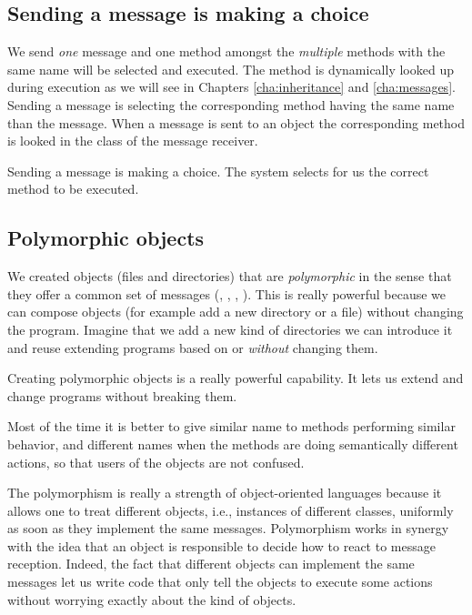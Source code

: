 \documentclass[10pt,twoside,english]{_support/latex/sbabook/sbabook}
\begin{document}
\subsection{Sending a message is making a choice}
We send \textit{one} message and one method amongst the \textit{multiple} methods with the same name will be selected and executed. The method is dynamically looked up during execution as we will see in Chapters \ref{cha:inheritance} and \ref{cha:messages}. Sending a message is selecting the corresponding method having the same name than the message.  When a message is sent to an object the corresponding method is looked in the class of the message receiver.

\begin{important}
Sending a message is making a choice. The system selects for us the correct method to be executed.
\end{important}
\subsection{Polymorphic objects }
We created objects (files and directories) that are \textit{polymorphic} in the sense that they offer a common set of messages (, , , ). This is really powerful because we can compose objects (for example add a new directory or a file) without changing the program. 
Imagine that we add a new kind of directories we can introduce it and reuse extending programs based on  or  \textit{without} changing them. 

\begin{important}
Creating polymorphic objects is a really powerful capability. It lets us extend and change programs without breaking them. 
\end{important}

Most of the time it is better to give similar name to methods performing similar behavior, and different names when the methods are doing semantically different actions, so that users of the objects are not confused. 

The  polymorphism is really a strength of object-oriented languages because it allows one to treat different objects, i.e., instances of different classes, uniformly as soon as they implement the same messages. Polymorphism works in synergy with the idea that an object is responsible to decide how to react to message reception. Indeed, the fact that different objects can implement the same messages let us write code that only tell the objects to execute some actions without worrying exactly about the kind of objects. 
\end{document}
